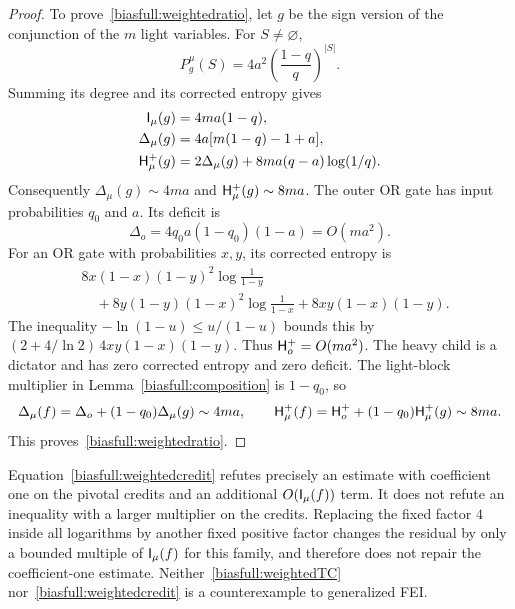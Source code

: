 \begin{proof}
To prove~\eqref{biasfull:weightedratio}, let \(g\) be the sign version
of the conjunction of the \(m\) light variables. For \(S\ne\varnothing\),
\[
 P_g^\mu(S)=4a^2\left(\frac{1-q}{q}\right)^{|S|}.
\]
Summing its degree and its corrected entropy gives
\begin{align}
 \mathsf I_\mu(g)&=4ma(1-q),\notag\\
 \Delta_\mu(g)&=4a[m(1-q)-1+a],\notag\\
 \mathsf H_\mu^+(g)&=2\Delta_\mu(g)
                 +8ma(q-a)\log(1/q).
                    \label{biasfull:andmany}
\end{align}
Consequently \(\Delta_\mu(g)\sim4ma\) and
\(\mathsf H_\mu^+(g)\sim8ma\).
The outer OR gate has input probabilities \(q_0\) and \(a\).
Its deficit is
\[
 \Delta_o=4q_0a(1-q_0)(1-a)=O(ma^2).
\]
For an OR gate with probabilities \(x,y\), its corrected entropy is
\begin{align*}
 &8x(1-x)(1-y)^2\log\frac1{1-y}\\
 &\quad+8y(1-y)(1-x)^2\log\frac1{1-x}
       +8xy(1-x)(1-y).
\end{align*}
The inequality \(-\ln(1-u)\le u/(1-u)\) bounds this by
\((2+4/\ln2)\,4xy(1-x)(1-y)\).
Thus \(\mathsf H_o^+=O(ma^2)\).
The heavy child is a dictator and has zero corrected entropy and
zero deficit. The light-block multiplier in
Lemma~\ref{biasfull:composition} is \(1-q_0\), so
\[
 \Delta_\mu(f)=\Delta_o+(1-q_0)\Delta_\mu(g)\sim4ma,\qquad
 \mathsf H_\mu^+(f)=\mathsf H_o^++(1-q_0)\mathsf H_\mu^+(g)\sim8ma.
\]
This proves~\eqref{biasfull:weightedratio}.
\end{proof}

\begin{remark}\label{biasfull:creditremark}
Equation~\eqref{biasfull:weightedcredit} refutes precisely an estimate
with coefficient one on the pivotal credits and an additional
\(O(\mathsf I_\mu(f))\) term. It does not refute an inequality with a larger
multiplier on the credits. Replacing the fixed factor \(4\) inside
all logarithms by another fixed positive factor changes the residual
by only a bounded multiple of \(\mathsf I_\mu(f)\) for this family, and
therefore does not repair the coefficient-one estimate.
Neither~\eqref{biasfull:weightedTC} nor~\eqref{biasfull:weightedcredit}
is a counterexample to generalized FEI.
\end{remark}

